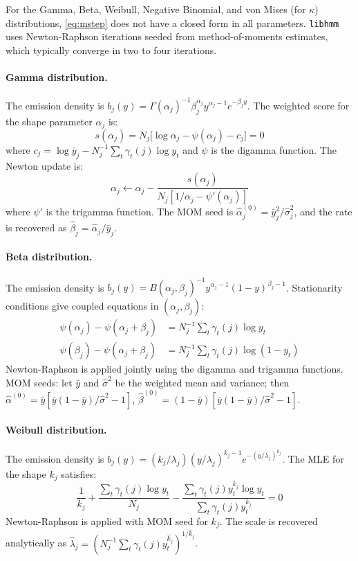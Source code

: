 \documentclass[11pt]{article}
\begin{document}
For the Gamma, Beta, Weibull, Negative Binomial, and von Mises (for $\kappa$)
distributions, \eqref{eq:mstep} does not have a closed form in all parameters.
\texttt{libhmm} uses Newton-Raphson iterations seeded from method-of-moments
estimates, which typically converge in two to four iterations.

\paragraph{Gamma distribution.}
The emission density is $b_j(y) = \Gamma(\alpha_j)^{-1} \beta_j^{\alpha_j}
y^{\alpha_j - 1} e^{-\beta_j y}$.
The weighted score for the shape parameter $\alpha_j$ is:
\begin{equation}
  s(\alpha_j) = N_j\bigl[\log \alpha_j - \psi(\alpha_j) - c_j\bigr] = 0
\end{equation}
where $c_j = \log \bar{y}_j - N_j^{-1} \sum_t \gamma_t(j) \log y_t$
and $\psi$ is the digamma function.
The Newton update is:
\begin{equation}
  \alpha_j \leftarrow \alpha_j - \frac{s(\alpha_j)}{N_j[1/\alpha_j - \psi'(\alpha_j)]}
\end{equation}
where $\psi'$ is the trigamma function.
The MOM seed is $\hat{\alpha}_j^{(0)} = \bar{y}_j^2 / \hat{\sigma}_j^2$,
and the rate is recovered as $\hat{\beta}_j = \hat{\alpha}_j / \bar{y}_j$.

\paragraph{Beta distribution.}
The emission density is $b_j(y) = B(\alpha_j, \beta_j)^{-1}
y^{\alpha_j-1}(1-y)^{\beta_j-1}$.
Stationarity conditions give coupled equations in $(\alpha_j, \beta_j)$:
\begin{align}
  \psi(\alpha_j) - \psi(\alpha_j + \beta_j) &=
    N_j^{-1} \sum_t \gamma_t(j) \log y_t \\
  \psi(\beta_j) - \psi(\alpha_j + \beta_j) &=
    N_j^{-1} \sum_t \gamma_t(j) \log(1 - y_t)
\end{align}
Newton-Raphson is applied jointly using the digamma and trigamma functions.
MOM seeds: let $\bar{y}$ and $\hat{\sigma}^2$ be the weighted mean and
variance; then $\hat{\alpha}^{(0)} = \bar{y}[\bar{y}(1-\bar{y})/\hat{\sigma}^2 - 1]$,
$\hat{\beta}^{(0)} = (1-\bar{y})[\bar{y}(1-\bar{y})/\hat{\sigma}^2 - 1]$.

\paragraph{Weibull distribution.}
The emission density is $b_j(y) = (k_j/\lambda_j)(y/\lambda_j)^{k_j-1}
e^{-(y/\lambda_j)^{k_j}}$.
The MLE for the shape $k_j$ satisfies:
\begin{equation}
  \frac{1}{k_j} + \frac{\sum_t \gamma_t(j) \log y_t}{N_j}
  - \frac{\sum_t \gamma_t(j) y_t^{k_j} \log y_t}{\sum_t \gamma_t(j) y_t^{k_j}}
  = 0
\end{equation}
Newton-Raphson is applied with MOM seed for $k_j$.
The scale is recovered analytically as
$\hat{\lambda}_j = (N_j^{-1} \sum_t \gamma_t(j) y_t^{\hat{k}_j})^{1/\hat{k}_j}$.
\end{document}
